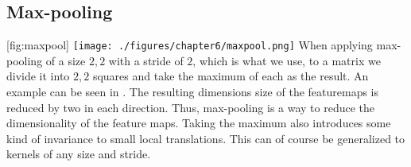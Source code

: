 \subsection{Max-pooling}
[fig:maxpool]
{\texttt{[image: ./figures/chapter6/maxpool.png]}}
When applying max-pooling of a size $2,2$ with a stride of $2$, which is what we use, to a matrix we divide it into $2,2$ squares and take the maximum of each as the result.
An example can be seen in .
The resulting dimensions size of the featuremaps is reduced by two in each direction. 
Thus, max-pooling is a way to reduce the dimensionality of the feature maps.
Taking the maximum also introduces some kind of invariance to small local translations. 
This can of course be generalized to kernels of any size and stride.
